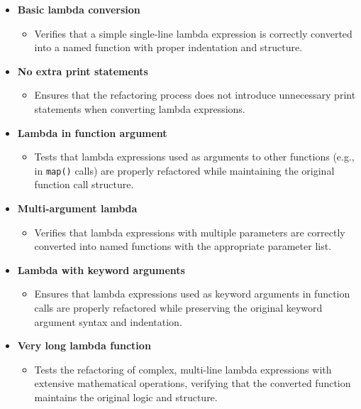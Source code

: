 \documentclass[12pt, titlepage]{article}
\begin{document}
  \begin{itemize}
    \item \textbf{Basic lambda conversion}
        \begin{itemize}
            \item Verifies that a simple single-line lambda expression is correctly converted into a named function with proper indentation and structure.
        \end{itemize}
    
    \item \textbf{No extra print statements}
        \begin{itemize}
            \item Ensures that the refactoring process does not introduce unnecessary print statements when converting lambda expressions.
        \end{itemize}
      
    \item \textbf{Lambda in function argument}
        \begin{itemize}
            \item Tests that lambda expressions used as arguments to other functions (e.g., in \texttt{map()} calls) are properly refactored while maintaining the original function call structure.
        \end{itemize}
      
    \item \textbf{Multi-argument lambda}
        \begin{itemize}
            \item Verifies that lambda expressions with multiple parameters are correctly converted into named functions with the appropriate parameter list.
        \end{itemize}
      
    \item \textbf{Lambda with keyword arguments}
        \begin{itemize}
            \item Ensures that lambda expressions used as keyword arguments in function calls are properly refactored while preserving the original keyword argument syntax and indentation.
        \end{itemize}
      
    \item \textbf{Very long lambda function}
        \begin{itemize}
            \item Tests the refactoring of complex, multi-line lambda expressions with extensive mathematical operations, verifying that the converted function maintains the original logic and structure.
        \end{itemize}
  \end{itemize}
\end{document}
